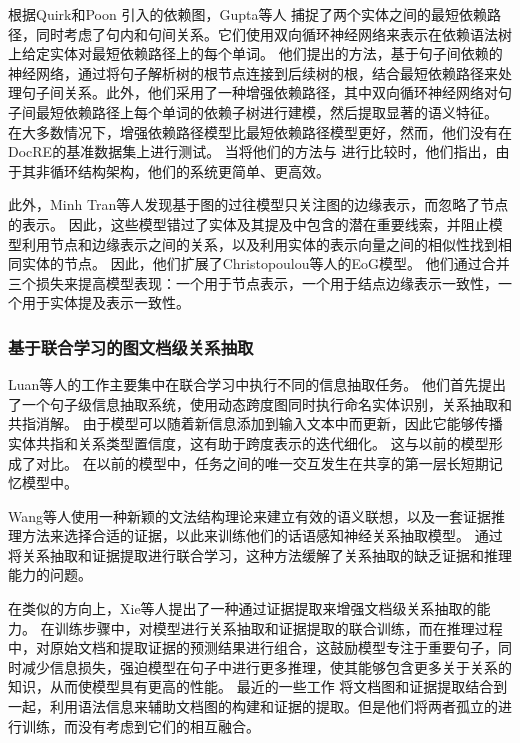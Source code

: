 \documentclass[bachelor]{thesis-uestc}
\begin{document}
根据Quirk和Poon 引入的依赖图，Gupta等人 捕捉了两个实体之间的最短依赖路径，同时考虑了句内和句间关系。它们使用双向循环神经网络来表示在依赖语法树上给定实体对最短依赖路径上的每个单词。
他们提出的方法，基于句子间依赖的神经网络，通过将句子解析树的根节点连接到后续树的根，结合最短依赖路径来处理句子间关系。此外，他们采用了一种增强依赖路径，其中双向循环神经网络对句子间最短依赖路径上每个单词的依赖子树进行建模，然后提取显著的语义特征。
在大多数情况下，增强依赖路径模型比最短依赖路径模型更好，然而，他们没有在DocRE的基准数据集上进行测试。
当将他们的方法与 \cite{peng-etal-2017-cross}进行比较时，他们指出，由于其非循环结构架构，他们的系统更简单、更高效。\par

此外，Minh Tran等人发现基于图的过往模型只关注图的边缘表示，而忽略了节点的表示。
因此，这些模型错过了实体及其提及中包含的潜在重要线索，并阻止模型利用节点和边缘表示之间的关系，以及利用实体的表示向量之间的相似性找到相同实体的节点。
因此，他们扩展了Christopoulou等人的EoG模型。
他们通过合并三个损失来提高模型表现：一个用于节点表示，一个用于结点边缘表示一致性，一个用于实体提及表示一致性。\par

\subsubsection{基于联合学习的图文档级关系抽取}\label{subsec:joined-graph}

Luan等人的工作主要集中在联合学习中执行不同的信息抽取任务。
他们首先提出了一个句子级信息抽取系统，使用动态跨度图同时执行命名实体识别，关系抽取和共指消解。
由于模型可以随着新信息添加到输入文本中而更新，因此它能够传播实体共指和关系类型置信度，这有助于跨度表示的迭代细化。
这与以前的模型形成了对比。
在以前的模型中，任务之间的唯一交互发生在共享的第一层长短期记忆模型中。\par

Wang等人使用一种新颖的文法结构理论来建立有效的语义联想，以及一套证据推理方法来选择合适的证据，以此来训练他们的话语感知神经关系抽取模型。
通过将关系抽取和证据提取进行联合学习，这种方法缓解了关系抽取的缺乏证据和推理能力的问题。\par

在类似的方向上，Xie等人提出了一种通过证据提取来增强文档级关系抽取的能力。
在训练步骤中，对模型进行关系抽取和证据提取的联合训练，而在推理过程中，对原始文档和提取证据的预测结果进行组合，这鼓励模型专注于重要句子，同时减少信息损失，强迫模型在句子中进行更多推理，使其能够包含更多关于关系的知识，从而使模型具有更高的性能。
最近的一些工作 \cite{SagDRE, duan-etal-2022-just} 将文档图和证据提取结合到一起，利用语法信息来辅助文档图的构建和证据的提取。但是他们将两者孤立的进行训练，而没有考虑到它们的相互融合。
\par
\end{document}
